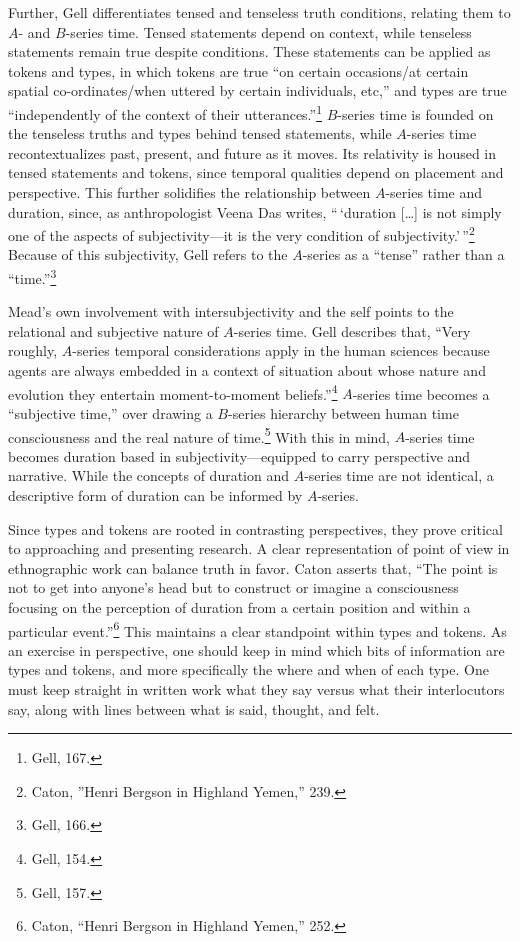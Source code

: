 Further, Gell differentiates tensed and tenseless truth conditions,
relating them to $A$- and $B$-series time. Tensed statements depend on
context, while tenseless statements remain true despite conditions.
These statements can be applied as tokens and types, in which tokens are
true ``on certain occasions/at certain spatial co-ordinates/when uttered
by certain individuals, etc,'' and types are true ``independently of the
context of their utterances.''\footnote{Gell, 167.} $B$-series time is
founded on the tenseless truths and types behind tensed statements,
while $A$-series time recontextualizes past, present, and future as it
moves. Its relativity is housed in tensed statements and tokens, since
temporal qualities depend on placement and perspective. This further
solidifies the relationship between $A$-series time and duration, since,
as anthropologist Veena Das writes, ``\,`duration {[}\ldots{]} is not
simply one of the aspects of subjectivity---it is the very condition of
subjectivity.'\,''\footnote{Caton, ''Henri Bergson in Highland Yemen,''
  239.} Because of this subjectivity, Gell refers to the $A$-series as a
``tense'' rather than a ``time.''\footnote{Gell, 166.}

Mead's own involvement with intersubjectivity and the self points to the
relational and subjective nature of $A$-series time. Gell describes that,
``Very roughly, $A$-series temporal considerations apply in the human
sciences because agents are always embedded in a context of situation
about whose nature and evolution they entertain moment-to-moment
beliefs.''\footnote{Gell, 154.} $A$-series time becomes a ``subjective
time,'' over drawing a $B$-series hierarchy between human time
consciousness and the real nature of time.\footnote{Gell, 157.} With
this in mind, $A$-series time becomes duration based in
subjectivity---equipped to carry perspective and narrative. While the
concepts of duration and $A$-series time are not identical, a descriptive
form of duration can be informed by $A$-series.

Since types and tokens are rooted in contrasting perspectives, they
prove critical to approaching and presenting research. A clear
representation of point of view in ethnographic work can balance truth
in favor. Caton asserts that, ``The point is not to get into anyone's
head but to construct or imagine a consciousness focusing on the
perception of duration from a certain position and within a particular
event.''\footnote{Caton, ``Henri Bergson in Highland Yemen,'' 252.} This
maintains a clear standpoint within types and tokens. As an exercise in
perspective, one should keep in mind which bits of information are types
and tokens, and more specifically the where and when of each type. One
must keep straight in written work what they say versus what their
interlocutors say, along with lines between what is said, thought, and
felt.

